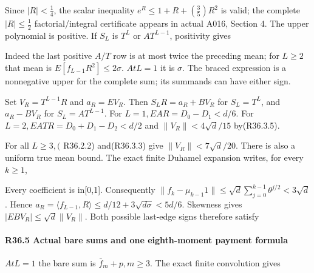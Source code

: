Since \(\lvert R\rvert <\frac{1}{4}\), the scalar inequality \(e^R\le 1+R+(\frac{3}{5})R^2\) is valid; the complete \(\lvert R\rvert \le \frac{1}{2}\) factorial/integral certificate appears in actual A016, Section 4. The upper polynomial is positive. If \(S_L\) is \(T^L\) or \(A T^{L-1}\), positivity gives


Indeed the last positive \(A/T\) row is at most twice the preceding mean; for \(L\ge 2\) that mean is \(E[f_{L-1}R^2]\le 2\sigma\). \(At L=1\) it is \(\sigma\). The braced expression is a nonnegative upper for the complete sum; its summands can have either sign.

Set \(V_R=T^{L-1}R\) and \(a_R=EV_R\). Then \(S_LR=a_R+B V_R\) for \(S_L=T^L\), and \(a_R-B V_R\) for \(S_L=A T^{L-1}\). For \(L=1,\allowbreak \allowbreak  EA R=D_0-D_1<d/6\). For \(L=2,\allowbreak \allowbreak  EA TR=D_0+D_1-D_2<d/2\) and \(\lVert V_R\rVert <4\sqrt{d}/15\) by(R36.3.5).

For all \(L\ge 3,\allowbreak \allowbreak  (\) R36.2.2) and(R36.3.3) give \(\lVert V_R\rVert <7\sqrt{d}/20\). There is also a uniform true mean bound. The exact finite Duhamel expansion writes, for every \(k\ge 1\),


Every coefficient is in[0,1]. Consequently \(\lVert f_k-\mu_{k-1}1\rVert \le \sqrt{d}\sum_{j=0}^{k-1}\theta^{j/2}<3\sqrt{d}\). Hence \(a_R=\langle f_{L-1},\allowbreak \allowbreak R\rangle \le d/12+3\sqrt{d \sigma}<5d/6\). Skewness gives \(\lvert EBV_R\rvert \le \sqrt{d}\lVert V_R\rVert \). Both possible last-edge signs therefore satisfy


\paragraph{R36.5 Actual bare sums and one eighth-moment payment formula}

\(At L=1\) the bare sum is \(\bar f_m+p,\allowbreak \allowbreak  m\ge 3\). The exact finite convolution gives

